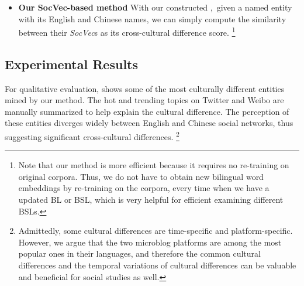 \begin{itemize}[-]
\item \textbf{Our SocVec-based method}  With our constructed \textit{\socvec},~given a named entity with its English and Chinese names, we can simply compute the similarity between their \textit{SocVec}s as its cross-cultural difference score. 
\footnote{Note that our method is more efficient because it requires no re-training on original corpora. Thus, we do not have to obtain new bilingual word embeddings by re-training on the corpora, every time when we have a updated BL or BSL, which is very helpful for efficient examining different BSLs. }

\end{itemize}

\subsection{Experimental Results}

For qualitative evaluation,  shows some of 
the most culturally different entities mined by our method. 
The hot and trending topics on Twitter and Weibo are 
manually summarized to help explain the cultural difference. 
The perception of these entities diverges widely between English and
Chinese social networks, thus suggesting
significant cross-cultural differences.
\footnote{Admittedly, some cultural differences are time-specific and platform-specific.
However, we argue that the two microblog platforms are among the most popular ones in their languages, and therefore the common cultural differences and the temporal variations of cultural differences can be valuable and beneficial for social studies as well.
}

